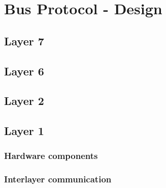 \section{Bus Protocol - Design}
\label{sec:bus:design}

\subsection{Layer 7}

\subsection{Layer 6}

\subsection{Layer 2}

\subsection{Layer 1}
\subsubsection{Hardware components}
\subsubsection{Interlayer communication}


